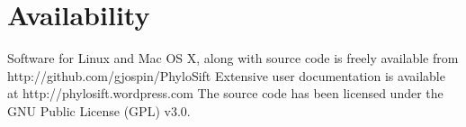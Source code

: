 \documentclass[10pt]{article}
\begin{document}
\section*{Availability}
Software for Linux and Mac OS X, along with source code is freely available from http://github.com/gjospin/PhyloSift
Extensive user documentation is available at http://phylosift.wordpress.com
The source code has been licensed under the GNU Public License (GPL) v3.0.




\clearpage
\end{document}
